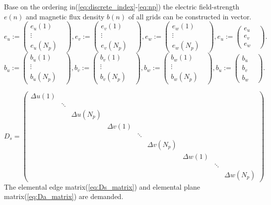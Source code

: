 Base on the ordering in(\ref{eq:discrete_index}-\ref{eq:np}) the electric field-strength $e(n)$ and magnetic flux density $b(n)$ of all grids can be constructed in vector.
\begin{equation}
e_{u}:=
\begin{pmatrix}
e_{u}(1)&\\
\vdots&\\
e_{u}(N_{p})&
\end{pmatrix},
e_{v}:=
\begin{pmatrix}
e_{v}(1)&\\
\vdots&\\
e_{v}(N_{p})&
\end{pmatrix},
e_{w}:=
\begin{pmatrix}
e_{w}(1)&\\
\vdots&\\
e_{w}(N_{p})&
\end{pmatrix},
e_{u}:=
\begin{pmatrix}
e_{u}&\\
e_{v}&\\
e_{w}&
\end{pmatrix}.
\label{eq:vector_e_field}
\end{equation}
\begin{equation}
b_{u}:=
\begin{pmatrix}
b_{u}(1)&\\
\vdots&\\
b_{u}(N_{p})&
\end{pmatrix},
b_{v}:=
\begin{pmatrix}
b_{v}(1)&\\
\vdots&\\
b_{v}(N_{p})&
\end{pmatrix},
b_{w}:=
\begin{pmatrix}
b_{w}(1)&\\
\vdots&\\
b_{w}(N_{p})&
\end{pmatrix},
b_{u}:=
\begin{pmatrix}
b_{u}&\\
b_{v}&\\
b_{w}&
\end{pmatrix}.
\label{eq:vector_m_flux_density}
\end{equation}

\begin{equation}
D_{s}=
	\begin{pmatrix}
	\Delta u(1)&&&&&&&&\\
	&\ddots &&&&&&&\\
	&&\Delta u(N_{p})&&&&&&\\
	&&&\Delta v(1)&&&&&\\
	&&&&\ddots &&&&\\
	&&&&&\Delta v(N_{p})&&&\\
	&&&&&&\Delta w(1)&&\\
	&&&&&&&\ddots &\\
	&&&&&&&&\Delta w(N_{p})
	\end{pmatrix}
	\label{eq:Ds_matrix}
\end{equation}
The elemental edge matrix(\ref{eq:Ds_matrix}) and elemental plane matrix(\ref{eq:Da_matrix}) are demanded.

